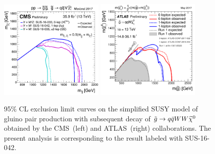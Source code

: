 \begin{figure}[!hb]
\centering
  \includegraphics[width=0.45\textwidth]{Plots/SUSY/CMS_SUSY_Strong_1Step}
   \includegraphics[width=0.45\textwidth]{Plots/SUSY/ATLAS_SUSY_Strong_1step}
  \caption{ 95\% CL exclusion limit curves on the simplified SUSY model of gluino pair production with subsequent decay of $\tilde{g}\rightarrow q\bar{q}WW\widetilde{\chi}^0$ obtained by the CMS~(left) and ATLAS~(right) collaborations. The present analysis is corresponding to the result labeled with SUS-16-042.
  }
  \label{fig:SUSY_strong_1step}
\end{figure}

